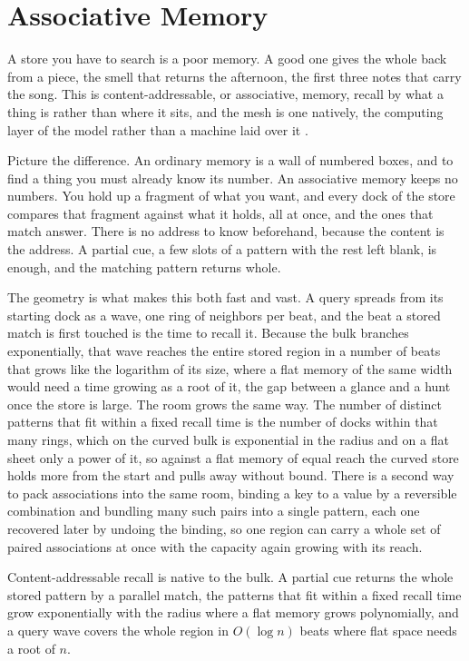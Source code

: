 \section{Associative Memory}

A store you have to search is a poor memory. A good one gives the whole back from a piece, the smell that returns the afternoon, the first three notes that carry the song. This is content-addressable, or associative, memory, recall by what a thing is rather than where it sits, and the mesh is one natively, the computing layer of the model rather than a machine laid over it \cite{potter1992}.

Picture the difference. An ordinary memory is a wall of numbered boxes, and to find a thing you must already know its number. An associative memory keeps no numbers. You hold up a fragment of what you want, and every dock of the store compares that fragment against what it holds, all at once, and the ones that match answer. There is no address to know beforehand, because the content is the address. A partial cue, a few slots of a pattern with the rest left blank, is enough, and the matching pattern returns whole.

The geometry is what makes this both fast and vast. A query spreads from its starting dock as a wave, one ring of neighbors per beat, and the beat a stored match is first touched is the time to recall it. Because the bulk branches exponentially, that wave reaches the entire stored region in a number of beats that grows like the logarithm of its size, where a flat memory of the same width would need a time growing as a root of it, the gap between a glance and a hunt once the store is large. The room grows the same way. The number of distinct patterns that fit within a fixed recall time is the number of docks within that many rings, which on the curved bulk is exponential in the radius and on a flat sheet only a power of it, so against a flat memory of equal reach the curved store holds more from the start and pulls away without bound. There is a second way to pack associations into the same room, binding a key to a value by a reversible combination and bundling many such pairs into a single pattern, each one recovered later by undoing the binding, so one region can carry a whole set of paired associations at once with the capacity again growing with its reach.

\begin{result}
Content-addressable recall is native to the bulk. A partial cue returns the whole stored pattern by a parallel match, the patterns that fit within a fixed recall time grow exponentially with the radius where a flat memory grows polynomially, and a query wave covers the whole region in $O(\log n)$ beats where flat space needs a root of $n$. \cite{pollard2026vibetest}
\end{result}

